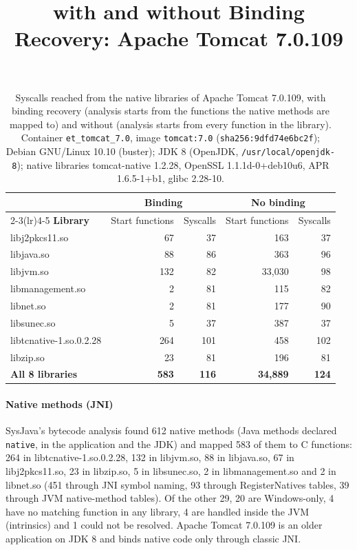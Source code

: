 \documentclass[10pt]{article}
\title{\sysname with and without Binding Recovery: Apache Tomcat 7.0.109}
\author{}
\date{\vspace{-8ex}}
\newcommand{\sysname}{SysJava\xspace}
\begin{document}
\maketitle

\begin{table}[H]
\centering
\caption{Syscalls reached from the native libraries of Apache Tomcat 7.0.109, with binding recovery (analysis starts from the functions the native methods are mapped to) and without (analysis starts from every function in the library). Container \texttt{et\_tomcat\_7.0}, image \texttt{tomcat:7.0} (\texttt{sha256:9dfd74e6bc2f}); Debian GNU/Linux 10.10 (buster); JDK 8 (OpenJDK, \texttt{/usr/local/openjdk-8}); native libraries tomcat-native 1.2.28, OpenSSL 1.1.1d-0+deb10u6, APR 1.6.5-1+b1, glibc 2.28-10.}
\label{tab:binding-tomcat-7-0}
\begin{tabular}{lrrrr}
\toprule
 & \multicolumn{2}{c}{\textbf{Binding}} & \multicolumn{2}{c}{\textbf{No binding}} \\
\cmidrule(lr){2-3}\cmidrule(lr){4-5}
\textbf{Library} & Start functions & Syscalls & Start functions & Syscalls \\
\midrule
libj2pkcs11.so & 67 & 37 & 163 & 37 \\
libjava.so & 88 & 86 & 363 & 96 \\
libjvm.so & 132 & 82 & 33,030 & 98 \\
libmanagement.so & 2 & 81 & 115 & 82 \\
libnet.so & 2 & 81 & 177 & 90 \\
libsunec.so & 5 & 37 & 387 & 37 \\
libtcnative-1.so.0.2.28 & 264 & 101 & 458 & 102 \\
libzip.so & 23 & 81 & 196 & 81 \\
\textbf{All 8 libraries} & \textbf{583} & \textbf{116} & \textbf{34,889} & \textbf{124} \\
\bottomrule
\end{tabular}
\end{table}

\paragraph*{Native methods (JNI)}
\sysname's bytecode analysis found 612 native methods (Java methods declared \texttt{native}, in the application and the JDK) and mapped 583 of them to C functions: 264 in libtcnative-1.so.0.2.28, 132 in libjvm.so, 88 in libjava.so, 67 in libj2pkcs11.so, 23 in libzip.so, 5 in libsunec.so, 2 in libmanagement.so and 2 in libnet.so (451 through JNI symbol naming, 93 through RegisterNatives tables, 39 through JVM native-method tables). Of the other 29, 20 are Windows-only, 4 have no matching function in any library, 4 are handled inside the JVM (intrinsics) and 1 could not be resolved. Apache Tomcat 7.0.109 is an older application on JDK 8 and binds native code only through classic JNI.
\end{document}
